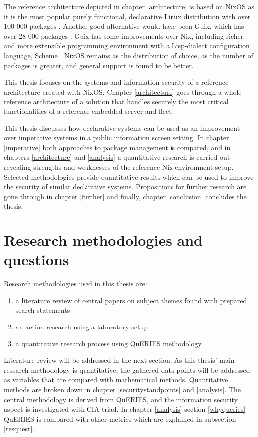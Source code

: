 The reference architecture depicted in chapter \ref{architecture} is
based on NixOS as it is the most popular purely functional,
declarative Linux distribution with over 100 000 packages
\cite{nixosNixOSSearch}. Another good alternative would have been
Guix, which has over 28 000 packages \cite{gnuPackagesx2014}. Guix has
some improvements over Nix, including richer and more extensible
programming environment with a Lisp-dialect configuration language,
Scheme \cite{courtes2021deploiements}. NixOS remains as the
distribution of choice, as the number of packages is greater, and
general support is found to be better.

This thesis focuses on the systems and information security of a
reference architecture created with NixOS. Chapter \ref{architecture}
goes through a whole reference architecture of a solution that handles
securely the most critical functionalities of a reference embedded
server and fleet.

This thesis discusses how declarative systems can be used as an
improvement over imperative systems in a public information screen
setting. In chapter \ref{imperative} both approaches to package
management is compared, and in chapters \ref{architecture} and
\ref{analysis} a quantitative research is carried out revealing
strengths and weaknesses of the reference Nix environment
setup. Selected methodologies provide quantitative results which can
be used to improve the security of similar declarative
systems. Propositions for further research are gone through in chapter
\ref{further} and finally, chapter \ref{conclusion} concludes the
thesis.

\section{Research methodologies and questions}

Research methodologies used in this thesis are:
\begin{enumerate}
\item a literature review of central papers on subject themes found
  with prepared search statements
\item an action research using a laboratory setup
\item a quantitative research process using QuERIES methodology
\end{enumerate}

Literature review will be addressed in the next section. As this
thesis' main research methodology is quantitative, the gathered data
points will be addressed as variables that are compared with
mathematical methods. Quantitative methods are broken down in chapter
\ref{securitystandpoints} and \ref{analysis}. The central methodology
is derived from QuERIES, and the information security aspect is
investigated with CIA-triad. In chapter \ref{analysis} section
\ref{whyqueries} QuERIES is compared with other metrics which are
explained in subsection \ref{resquest}.

